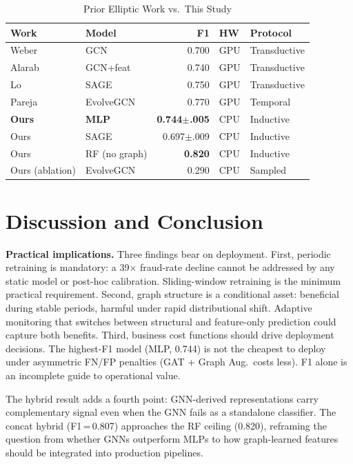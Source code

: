 \documentclass[journal,10pt,twoside]{IEEEtran}
\begin{document}
\begin{table}[!t]
\centering
\caption{Prior Elliptic Work vs.\ This Study}
\label{tab:prior}
\scriptsize
\setlength{\tabcolsep}{3pt}
\begin{tabular}{llrll}
\toprule
\textbf{Work} & \textbf{Model} & \textbf{F1}
  & \textbf{HW} & \textbf{Protocol} \\
\midrule
Weber \cite{weber2019}    & GCN       & 0.700 & GPU & Transductive \\
Alarab \cite{alarab2020}  & GCN+feat  & 0.740 & GPU & Transductive \\
Lo \cite{lo2023}          & SAGE      & 0.750 & GPU & Transductive \\
Pareja \cite{pareja2020evolvegcn} & EvolveGCN & 0.770 & GPU
  & Temporal \\
\midrule
\textbf{Ours} & \textbf{MLP} & \textbf{0.744$\pm$.005}
  & CPU & Inductive \\
Ours & SAGE & 0.697$\pm$.009 & CPU & Inductive \\
Ours & RF (no graph) & \textbf{0.820} & CPU & Inductive \\
Ours (ablation) & EvolveGCN & 0.290 & CPU & Sampled \\
\bottomrule
\end{tabular}
\end{table}

\section{Discussion and Conclusion}
\label{sec:conclusion}

\textbf{Practical implications.} Three findings bear on deployment.
First, periodic retraining is mandatory: a 39$\times$ fraud-rate
decline cannot be addressed by any static model or post-hoc
calibration. Sliding-window retraining is the minimum practical
requirement. Second, graph structure is a conditional asset:
beneficial during stable periods, harmful under rapid distributional
shift. Adaptive monitoring that switches between structural and
feature-only prediction could capture both benefits. Third, business
cost functions should drive deployment decisions. The highest-F1 model
(MLP, 0.744) is not the cheapest to deploy under asymmetric FN/FP
penalties (GAT + Graph Aug.\ costs less). F1 alone is an incomplete
guide to operational value.

The hybrid result adds a fourth point: GNN-derived representations
carry complementary signal even when the GNN fails as a standalone
classifier. The concat hybrid (F1\,=\,0.807) approaches the RF
ceiling (0.820), reframing the question from whether GNNs outperform
MLPs to how graph-learned features should be integrated into
production pipelines.
\end{document}
